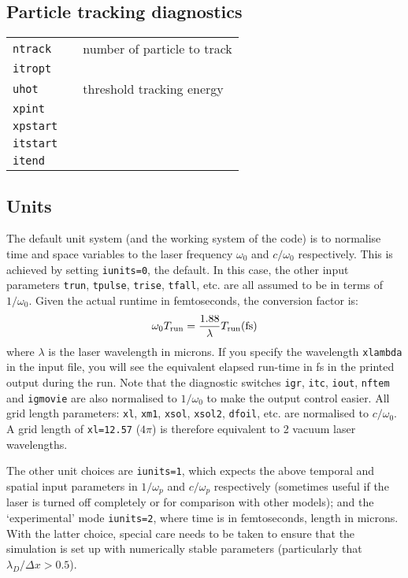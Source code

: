 \documentclass[11pt]{article}
\newcommand{\downbox}[1]{_{\mbox{\scriptsize\rm #1}}}
\begin{document}
\subsection{Particle tracking diagnostics}
\begin{tabular}{lrl} 
\texttt{ntrack} & & number of particle to track \\
\texttt{itropt} & & \\
\texttt{uhot} & & threshold tracking energy \\
\texttt{xpint} & & \\
\texttt{xpstart} & & \\
\texttt{itstart} & & \\
\texttt{itend} & & 
\end{tabular}





\subsection{Units} 
 The default unit system (and the working system of the code) is to normalise time and space variables 
to the laser frequency $\omega_0$ and $c/\omega_0$ respectively. This is achieved by setting \texttt{iunits=0}, the default.  In this case, the other input parameters \texttt{trun}, \texttt{tpulse}, \texttt{trise}, \texttt{tfall}, etc. are all assumed to be in terms of $1/\omega_0$. Given the actual runtime in femtoseconds, the conversion factor is: 
 $$\omega_0 T\downbox{run} = \frac{1.88}{\lambda} T\downbox{run} \mbox{(fs)} $$
where $\lambda$ is the laser wavelength in microns. If you specify the wavelength \texttt{xlambda} in the input file, you will see the 
equivalent elapsed run-time in fs in the printed output during the run. Note that the diagnostic switches \texttt{igr}, \texttt{itc}, \texttt{iout}, \texttt{nftem} 
and \texttt{igmovie} are also normalised to $1/\omega_0$ to make the output control easier. 
All grid length parameters: \texttt{xl}, \texttt{xm1}, \texttt{xsol}, \texttt{xsol2}, \texttt{dfoil}, etc. are normalised to $c/\omega_0$. A grid length of \texttt{xl=12.57} ($4\pi$) is therefore equivalent to 2 vacuum laser wavelengths. 

The other unit choices are \texttt{iunits=1}, which expects the above temporal and spatial input parameters
 in  $1/\omega_p$ and $c/\omega_p$ respectively (sometimes useful if the laser is turned off completely or for
 comparison with other models); and the `experimental' mode \texttt{iunits=2}, where time is in femtoseconds,
 length in microns.  With the latter choice, special care needs to be taken to ensure that the simulation is
set up with numerically stable parameters (particularly that $\lambda_D/\Delta x>0.5$).
\end{document}
